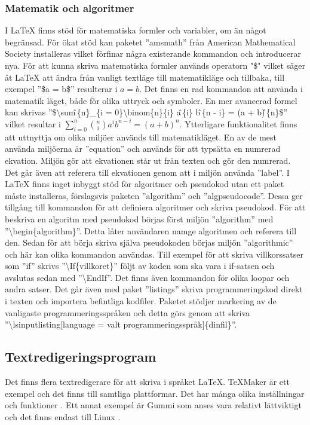 \subsubsection{Matematik och algoritmer}
I {\LaTeX} finns stöd för matematiska formler och variabler, om än något begränsad. För ökat stöd kan paketet ''amsmath'' från American Mathematical Society installeras vilket förfinar några existerande kommandon och introducerar nya. För att kunna skriva matematiska formler används operatorn "\$" \hspace{0.2mm} vilket säger åt {\LaTeX} att ändra från vanligt textläge till matematikläge och tillbaka, till exempel ''\$a = b\$'' resulterar i $a = b$. Det finns en rad kommandon att använda i matematik läget, både för olika uttryck och symboler. En mer avancerad formel kan skrivas ''\$\textbackslash sum\^ \,\{n\}\_\{i = 0\}\textbackslash binom\{n\}\{i\} a\^ \,\{i\} b\^ \,\{n - i\} = (a + b)\^ \,\{n\}\$'' vilket resultar i $\sum^{n}_{i=0}\binom{n}{i}a^{i}b^{n-i} = (a + b)^{n}$. \citep{latexandfriends}
\newline
\newline
Ytterligare funktionalitet finns att uttnyttja om olika miljöer används till matematikläget. En av de mest använda miljöerna är ''equation'' och används för att typsätta en numrerad ekvation. Miljön gör att ekvationen står ut från texten och gör den numrerad. Det går även att referera till ekvationen genom att i miljön använda ''label''. \citep{latexandfriends}    
\newline
\newline
I {\LaTeX} finns inget inbyggt stöd för algoritmer och pseudokod utan ett paket måste installeras, förslagsvis paketen ''algorithm'' och ''algpseudocode''. Dessa ger tillgång till kommandon för att definiera algoritmer och skriva pseudokod. För att beskriva en algoritm med pseudokod börjas först miljön ''algorithm'' med ''\textbackslash begin\{algorithm\}''. Detta låter användaren namge algoritmen och referera till den. Sedan för att börja skriva själva pseudokoden börjas miljön ''algorithmic'' och här kan olika kommandon användas. Till exempel för att skriva villkorssatser som ''if'' skrivs ''\textbackslash If\{villkoret\}'' följt av koden som ska vara i if-satsen och avslutas sedan med ''\textbackslash EndIf''. Det finns även kommandon för olika loopar och andra satser. \citep{latexandfriends}
\newline
\newline
Det går även med paket ''listings'' skriva programmeringskod direkt i texten och importera befintliga kodfiler. Paketet stödjer markering av de vanligaste programmeringsspråken och detta görs genom att skriva ''\textbackslash lsinputlisting[language = valt programmeringsspråk]\{dinfil\}''. \citep{latexandfriends} 

\subsection{Textredigeringsprogram}
Det finns flera textredigerare för att skriva i språket {\LaTeX}. TeXMaker är ett exempel och det finns till samtliga plattformar. Det har många olika inställningar och funktioner \citep{texmaker}. Ett annat exempel är Gummi som anses vara relativt lättviktigt och det finns endast till Linux \citep{gummi}.   
